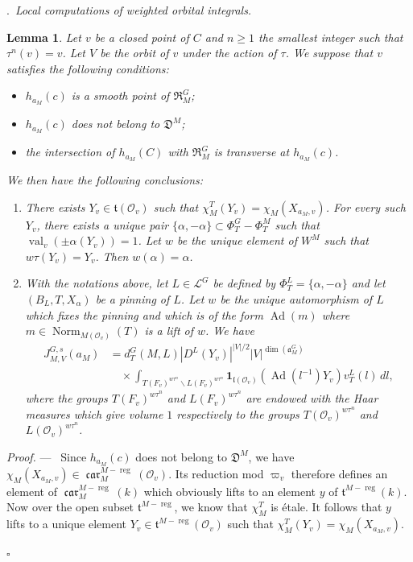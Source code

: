 \documentclass[12pt,a4paper,oneside,english,leqno]{smfart}
\makeatletter
\numberwithin{equation}{subsection}
\newcounter{theo}
\numberwithin{theo}{subsection}
\newenvironment{paragr}[1][]{\medskip\refstepcounter{subsection}%
  \par\noindent\hspace*{\parindent}\thesubsection.\ \emph{#1}%
  \@ifundefined{@empty}{}{}\ignorespaces}{\medskip}
\theoremstyle{plain}
\newtheorem{lemma}[theo]{Lemma}
\theoremstyle{definition}
\theoremstyle{remark}
\newenvironment{preuve}[1][]{\medskip\noindent\textit{Proof.} #1 ---\ }%
  {\hfill\ensuremath{\square}\medskip}
\DeclareMathOperator{\reg}{reg}
\DeclareMathOperator{\Ad}{Ad}
\DeclareMathOperator{\Norm}{Norm}
\DeclareMathOperator{\val}{val}
\DeclareMathOperator{\car}{\mathfrak{car}}
\newcommand{\oc}{\mathcal{O}}
\newcommand{\lc}{\mathcal{L}}
\newcommand{\ago}{\mathfrak{a}}
\newcommand{\tgo}{\mathfrak{t}}
\newcommand{\lgo}{\mathfrak{l}}
\newcommand{\back}{\backslash}
\renewcommand{\geq}{\geqslant}
\makeatother
\begin{document}
\begin{paragr}[Local computations of weighted orbital integrals.]
\begin{lemma}\label{thm:17.6.2}
Let $v$ be a closed point of $C$ and $n\geq 1$ the smallest integer such that $\tau^n(v)=v$. Let $V$ be the orbit of $v$ under the action of $\tau$. We suppose that $v$ satisfies the following conditions{\rm :}
\begin{itemize}
\item[--] $h_{a_M}(c)$ is a smooth point of $\mathfrak{R}^G_M${\rm ;} \item[--] $h_{a_M}(c)$ does not belong to $\mathfrak{D}^M${\rm ;} \item[--] the intersection of $h_{a_M}(C)$ with $\mathfrak{R}^G_M$ is transverse at $h_{a_M}(c)$.
\end{itemize}
We then have the following conclusions{\rm :}
\begin{enumerate}
\item There exists $Y_v\in\tgo(\oc_v)$ such that $\chi^T_M(Y_v)=\chi_M(X_{a_M,v})$. For every such $Y_v$, there exists a unique pair $\{\alpha,-\alpha\}\subset\Phi^G_T-\Phi^M_T$ such that $\val_v(\pm\alpha(Y_v))=1$. Let $w$ be the unique element of $W^M$ such that $w\tau(Y_v)=Y_v$. Then $w(\alpha)=\alpha$. \item With the notations above, let $L\in\lc^G$ be defined by $\Phi^L_T=\{\alpha,-\alpha\}$ and let $(B_L,T,X_\alpha)$ be a pinning of $L$. Let $w$ be the unique automorphism of $L$ which fixes the pinning and which is of the form $\Ad(m)$ where $m\in\Norm_{M(\oc_v)}(T)$ is a lift of $w$. We have
\[
\begin{aligned}
J^{G,s}_{M,V}(a_M)&=d^G_T(M,L)|D^L(Y_v)|^{|V|/2}|V|^{\dim(\ago^G_M)}\\
&\quad\times\int_{T(F_v)^{w\tau^n}\back L(F_v)^{w\tau^n}}
\mathbf{1}_{\lgo(\oc_v)}(\Ad(l^{-1})Y_v)v^L_T(l)\,dl,
\end{aligned}
\]
where the groups $T(F_v)^{w\tau^n}$ and $L(F_v)^{w\tau^n}$ are endowed with the Haar measures which give volume $1$ respectively to the groups $T(\oc_v)^{w\tau^n}$ and $L(\oc_v)^{w\tau^n}$.
\end{enumerate}
\end{lemma}

\begin{preuve}
Since $h_{a_M}(c)$ does not belong to $\mathfrak{D}^M$, we have $\chi_M(X_{a_M,v})\in\car_M^{M-\reg}(\oc_v)$. Its reduction mod $\varpi_v$ therefore defines an element of $\car_M^{M-\reg}(k)$ which obviously lifts to an element $y$ of $\tgo^{M-\reg}(k)$. Now over the open subset $\tgo^{M-\reg}$, we know that $\chi^T_M$ is étale. It follows that $y$ lifts to a unique element $Y_v\in\tgo^{M-\reg}(\oc_v)$ such that $\chi^T_M(Y_v)=\chi_M(X_{a_M,v})$.


\end{preuve}
\end{paragr}
\end{document}
